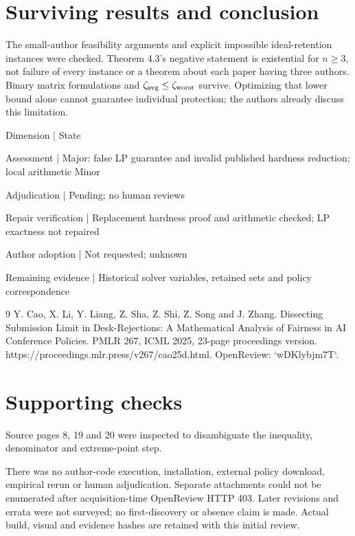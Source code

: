 \documentclass[10pt]{article}
\begin{document}
\section*{Surviving results and conclusion}
The small-author feasibility arguments and explicit impossible ideal-retention instances were checked. Theorem 4.3’s negative statement is existential for \(n\ge3\), not failure of every instance or a theorem about each paper having three authors. Binary matrix formulations and \(\zeta_{\rm avg}\le\zeta_{\rm worst}\) survive. Optimizing that lower bound alone cannot guarantee individual protection; the authors already discuss this limitation.\par
Dimension | State\par
Assessment | Major: false LP guarantee and invalid published hardness reduction; local arithmetic Minor\par
Adjudication | Pending; no human reviews\par
Repair verification | Replacement hardness proof and arithmetic checked; LP exactness not repaired\par
Author adoption | Not requested; unknown\par
Remaining evidence | Historical solver variables, retained sets and policy correspondence\par
9 Y. Cao, X. Li, Y. Liang, Z. Sha, Z. Shi, Z. Song and J. Zhang. Dissecting Submission Limit in Desk-Rejections: A Mathematical Analysis of Fairness in AI Conference Policies. PMLR 267, ICML 2025, 23-page proceedings version. https://proceedings.mlr.press/v267/cao25d.html. OpenReview: `wDKlybjm7T`.\par
\section*{Supporting checks}
Source pages 8, 19 and 20 were inspected to disambiguate the inequality, denominator and extreme-point step.\par
There was no author-code execution, installation, external policy download, empirical rerun or human adjudication. Separate attachments could not be enumerated after acquisition-time OpenReview HTTP 403. Later revisions and errata were not surveyed; no first-discovery or absence claim is made. Actual build, visual and evidence hashes are retained with this initial review.\par
\end{document}
